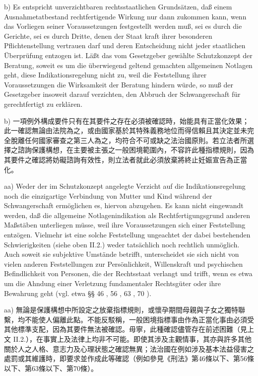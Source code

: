 \documentclass[12pt]{article}
\begin{document}
\begin{sourcepara}[title={原文D.93}]
b) Es entspricht unverzichtbaren rechtsstaatlichen Grundsätzen, daß einem Ausnahmetatbestand rechtfertigende Wirkung nur dann zukommen kann, wenn das Vorliegen seiner Voraussetzungen festgestellt werden muß, sei es durch die Gerichte, sei es durch Dritte, denen der Staat kraft ihrer besonderen Pflichtenstellung vertrauen darf und deren Entscheidung nicht jeder staatlichen Überprüfung entzogen ist. Läßt das vom Gesetzgeber gewählte Schutzkonzept der Beratung, soweit es um die überwiegend geltend gemachten allgemeinen Notlagen geht, diese Indikationsregelung nicht zu, weil die Feststellung ihrer Voraussetzungen die Wirksamkeit der Beratung hindern würde, so muß der Gesetzgeber insoweit darauf verzichten, den Abbruch der Schwangerschaft für gerechtfertigt zu erklären.
\end{sourcepara}
\begin{transpara}
b) 一項例外構成要件只有在其要件之存在必須被確認時，始能具有正當化效果；此一確認無論由法院為之，或由國家基於其特殊義務地位而得信賴且其決定並未完全脫離任何國家審查之第三人為之，均符合不可或缺之法治國原則。若立法者所選擇之諮詢保護構想，在主要被主張之一般困境範圍內，不容許此種指標規則，因為其要件之確認將妨礙諮詢有效性，則立法者就此必須放棄將終止妊娠宣告為正當化。
\end{transpara}

\begin{sourcepara}[title={原文D.94}]
aa) Weder der im Schutzkonzept angelegte Verzicht auf die Indikationsregelung noch die einzigartige Verbindung von Mutter und Kind während der Schwangerschaft ermöglichen es, hiervon abzugehen. Es kann nicht eingewandt werden, daß die allgemeine Notlagenindikation als Rechtfertigungsgrund anderen Maßstäben unterliegen müsse, weil ihre Voraussetzungen sich einer Feststellung entzögen. Vielmehr ist eine solche Feststellung ungeachtet der dabei bestehenden Schwierigkeiten (siehe oben II.2.) weder tatsächlich noch rechtlich unmöglich. Auch soweit sie subjektive Umstände betrifft, unterscheidet sie sich nicht von vielen anderen Feststellungen zur Persönlichkeit, Willenskraft und psychischen Befindlichkeit von Personen, die der Rechtsstaat verlangt und trifft, wenn es etwa um die Ahndung einer Verletzung fundamentaler Rechtsgüter oder ihre Bewahrung geht (vgl. etwa §§ 46 \abbrFF{}, 56 \abbrFF{}, 63 \abbrFF{}, 70 \abbrStGB{}).
\end{sourcepara}
\begin{transpara}
aa) 無論是保護構想中所設定之放棄指標規則，或懷孕期間母親與子女之獨特聯繫，均不能使人偏離此點。不能反駁稱，一般困境指標事由作為正當化事由必須受其他標準支配，因為其要件無法被確認。毋寧，此種確認儘管存在前述困難（見上文 II.2.），在事實上及法律上均非不可能。即使其涉及主觀情事，其亦與許多其他關於人之人格、意志力及心理狀態之確認無異；法治國在例如涉及基本法益侵害之處罰或其維護時，即要求並作成此等確認（例如參見《刑法》第46條以下、第56條以下、第63條以下、第70條）。
\end{transpara}
\end{document}
